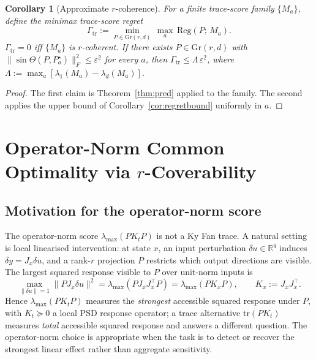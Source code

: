 \documentclass[final,3p,times]{elsarticle}
\newtheorem{corollary}[theorem]{Corollary}
\newcommand{\Gr}{\mathrm{Gr}}
\newcommand{\tr}{\mathrm{tr}}
\newcommand{\R}{\mathbb{R}}
\newcommand{\Reg}{\mathrm{Reg}}
\begin{document}
\begin{corollary}[Approximate $r$-coherence]\label{cor:approxcoh}
For a finite trace-score family $\{M_a\}$, define the \emph{minimax
trace-score regret}
\begin{equation}\label{eq:gamma}
\Gamma_{\mathrm{tr}}
:= \min_{P\in\Gr(r,d)}\,\max_a\,\Reg(P;\,M_a).
\end{equation}
$\Gamma_{\mathrm{tr}}=0$ iff $\{M_a\}$ is $r$-coherent.
If there exists $P\in\Gr(r,d)$ with $\|\sin\Theta(P,P_a^\star)\|_F^2
\le\varepsilon^2$ for every $a$, then
$\Gamma_{\mathrm{tr}}\le\Lambda\,\varepsilon^2$, where
$\Lambda:=\max_a[\lambda_1(M_a)-\lambda_d(M_a)]$.
\end{corollary}

\begin{proof}
The first claim is Theorem~\ref{thm:pred} applied to the family.
The second applies the upper bound of Corollary~\ref{cor:regretbound}
uniformly in $a$.
\end{proof}

\section{Operator-Norm Common Optimality via \texorpdfstring{$r$}{r}-Coverability}
\label{sec:caus}

\subsection{Motivation for the operator-norm score}

The operator-norm score $\lambda_{\max}(PK_tP)$ is not a Ky Fan trace.
A natural setting is local linearised intervention: at state $x$, an
input perturbation $\delta u\in\R^q$ induces $\delta y=J_x\delta u$, and
a rank-$r$ projection $P$ restricts which output directions are visible.
The largest squared response visible to $P$ over unit-norm inputs is
\begin{equation}\label{eq:causmotiv}
\max_{\|\delta u\|=1}\|PJ_x\delta u\|^2
=\lambda_{\max}(PJ_xJ_x^\top P)
=\lambda_{\max}(PK_xP),\qquad K_x:=J_xJ_x^\top.
\end{equation}
Hence $\lambda_{\max}(PK_tP)$ measures the \emph{strongest} accessible
squared response under $P$, with $K_t\succeq 0$ a local PSD response
operator; a trace alternative $\tr(PK_t)$ measures \emph{total}
accessible squared response and answers a different question.
The operator-norm choice is appropriate when the task is to detect or
recover the strongest linear effect rather than aggregate sensitivity.
\end{document}

